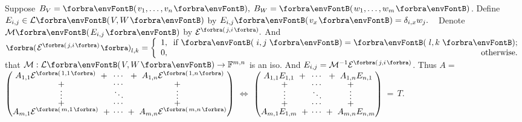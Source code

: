\BulletPointX\NoteFor{[3.60]}\;\;Suppose $B_V=\Par{v_1,\dots,v_n},\;B_W=\Par{w_1,\dots,w_m}$.\TextB{\vspace{2pt}}
{Define $E_{i,j}\in\Lm{V,W}$ by $E_{i,j}\Par{v_x}=\delta_{i,x} w_j.$} \quad\Corollary\,\,\, \TextB{}
{\Large Denote \envFontLarge$\Mt{E_{i,j}}$ by $\mathcal{E}^{\SmallPar[1pt]{j,i}}.$} And $\BigPar{\mathcal{E}^{\SmallPar[1pt]{j,i}}}_{l,k}=\MathLeftBrace{l}{1,\;\;\text{if }\Par[3pt]{i,j}=\Par[3pt]{l,k};\\0,\hfill\text{otherwise.}}$\TextB{\vspace{4pt}}
{\NOTICE that $\mathcal{M}:\Lm{V,W}\rightarrow\Fbb^{m,n}$ is an iso. And $E_{i,j}=\Mneg\mathcal{E}^{\SmallPar[1pt]{j,i}}$.}\TextB{\vspace{4pt}}
Thus $A={}${\normalsize$\envFontSmall[\scriptsize]\begin{pmatrix}
A_{1,1}\mathcal{E}^{\Par{1,1}}\;\;+&\hspace{-6pt}
\cdots &\hspace{-6pt}+\;\;A_{1,n}\mathcal{E}^{\Par{1,n}}\\[-2pt]
+&\hspace{-6pt}\cdots &\hspace{-6pt}+\\[-4pt]
\vdots &\hspace{-6pt} \ddots &\hspace{-6pt} \vdots\\[-4pt]
+&\hspace{-6pt}\cdots &\hspace{-6pt}+\\[-2pt]
A_{m,1}\mathcal{E}^{\Par{m,1}}\;\;+&\hspace{-6pt}\cdots&\hspace{-6pt}+\;\;A_{m,n}\mathcal{E}^{\Par{m,n}}
\end{pmatrix} $}$\;\Longleftrightarrow\;${\normalsize\envFontSmall$\begin{pmatrix}
		A_{1,1}E_{1,1}\;\;+&\hspace{-6pt}\cdots &\hspace{-6pt}+\;\;A_{1,n}E_{n,1}\\[-2pt]
		+&\hspace{-6pt}\cdots &\hspace{-6pt} +\\[-4pt]
		\vdots &\hspace{-6pt} \ddots &\hspace{-6pt} \vdots\\[-4pt]
		+&\hspace{-6pt}\cdots &\hspace{-6pt} +\\[-2pt]
		A_{m,1}E_{1,m}\;\;+&\hspace{-6pt}\cdots &\hspace{-6pt}+\;\;A_{m,n}E_{n,m}
	\end{pmatrix}$}$\,=\,T$.\vspace{6pt}\TextB{}
